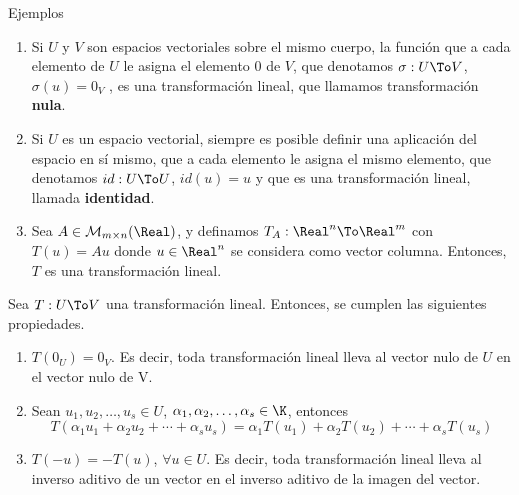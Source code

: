 \begin{frame}{Ejemplos}
\vspace{-0.25cm}
\begin{enumerate}[<+->]
\item Si $U$ y $V$ son espacios vectoriales sobre el mismo cuerpo, la función que a cada elemento de $U$ le asigna el elemento $0$ de $V$, que denotamos $\sigma:U\To V$, $\sigma(u)=0_V$ , es una
transformación lineal, que llamamos transformación \textbf{nula}.
\item Si $U$ es un espacio vectorial, siempre es posible definir una aplicación del espacio en sí mismo, que a cada elemento le asigna el mismo elemento, que denotamos $id:U\To U$, $id(u)=u$ y que es una transformación lineal, llamada \textbf{identidad}.
\item Sea $A\in\mathcal{M}_{m\times n}(\Real)$, y definamos $T_A:\Real^n\To\Real^m$ con $T(u)=Au$ donde $u\in\Real^n$ se considera como vector columna. Entonces, $T$ es una transformación lineal. 
\end{enumerate}
\end{frame}

\begin{frame}
\begin{prop}
Sea $T:U\To V$ una transformación lineal. Entonces, se cumplen las siguientes propiedades.
\begin{enumerate}
\item $T(0_U)=0_V$. Es decir, toda transformación lineal lleva al vector nulo de $U$ en el vector nulo de V.
\item Sean $u_1,u_2,\ldots,u_s\in U$, $\alpha_1,\alpha_2,\ldots,\alpha_s\in \K$, entonces 
$$T(\alpha_1u_1+\alpha_2u_2+\cdots+\alpha_su_s)=\alpha_1T(u_1)+\alpha_2T(u_2)+\cdots+\alpha_sT(u_s)$$
\item $T(-u)=-T(u)$, $\forall u\in U$. Es decir, toda transformación lineal lleva al inverso aditivo de un vector en el inverso aditivo de la imagen del vector.
\end{enumerate}
\end{prop}
\end{frame} 

